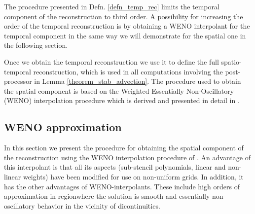 \documentclass[final]{amsart}
\numberwithin{equation}{section}
\begin{document}
\begin{Rem} The procedure presented in Defn. \ref{defn_temp_rec} limits the temporal component of the reconstruction to third order.  A possibility for increasing the order of the temporal reconstruction is by obtaining a WENO interpolant for the temporal component in the same way we will demonstrate for the spatial one in the following section.
\end{Rem}

Once we obtain the temporal reconstruction we use it to define the
full spatio-temporal reconstruction, which is used in all computations
involving the post-processor in Lemma \ref{theorem_stab_advection}.
The procedure used to obtain the spatial component is based on the
Weighted Essentially Non-Oscillatory (WENO) interpolation procedure
which is derived and presented in detail in \cite{janett2019novel}.

\subsection{WENO approximation}  In this section we present the procedure for obtaining the spatial component of the reconstruction using the WENO interpolation procedure of \cite{janett2019novel}. An advantage of this interpolant is that all its aspects (sub-stencil polynomials, linear and non-linear weights) have been modified for use on non-uniform grids.  In addition, it has the other advantages of WENO-interpolants.  These include high orders of approximation in regionwhere the solution is smooth and essentially non-oscillatory behavior in the vicinity of dicontinuities.  
\end{document}
